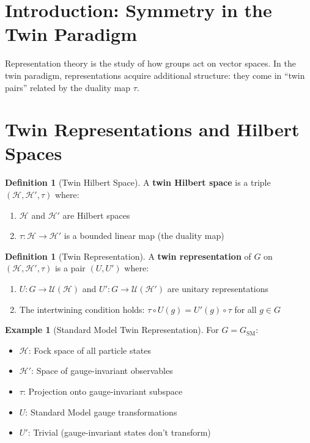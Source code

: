 \documentclass[11pt,a4paper,openright]{book}
\theoremstyle{plain}
\theoremstyle{definition}
\newtheorem{definition}[theorem]{Definition}
\newtheorem{example}[theorem]{Example}
\newcommand{\Hil}{\mathcal{H}}
\newcommand{\SM}{\mathrm{SM}}
\begin{document}
\section{Introduction: Symmetry in the Twin Paradigm}

Representation theory is the study of how groups act on vector spaces. In the twin paradigm, representations acquire additional structure: they come in ``twin pairs'' related by the duality map $\tau$.

\section{Twin Representations and Hilbert Spaces}

\begin{definition}[Twin Hilbert Space]
A \textbf{twin Hilbert space} is a triple $(\Hil, \Hil', \tau)$ where:
\begin{enumerate}[label=(\roman*)]
    \item $\Hil$ and $\Hil'$ are Hilbert spaces
    \item $\tau: \Hil \to \Hil'$ is a bounded linear map (the duality map)
\end{enumerate}
\end{definition}

\begin{definition}[Twin Representation]
A \textbf{twin representation} of $G$ on $(\Hil, \Hil', \tau)$ is a pair $(U, U')$ where:
\begin{enumerate}[label=(\roman*)]
    \item $U: G \to \mathcal{U}(\Hil)$ and $U': G \to \mathcal{U}(\Hil')$ are unitary representations
    \item The intertwining condition holds: $\tau \circ U(g) = U'(g) \circ \tau$ for all $g \in G$
\end{enumerate}
\end{definition}

\begin{example}[Standard Model Twin Representation]
For $G = G_{\SM}$:
\begin{itemize}
    \item $\Hil$: Fock space of all particle states
    \item $\Hil'$: Space of gauge-invariant observables
    \item $\tau$: Projection onto gauge-invariant subspace
    \item $U$: Standard Model gauge transformations
    \item $U'$: Trivial (gauge-invariant states don't transform)
\end{itemize}
\end{example}
\end{document}
